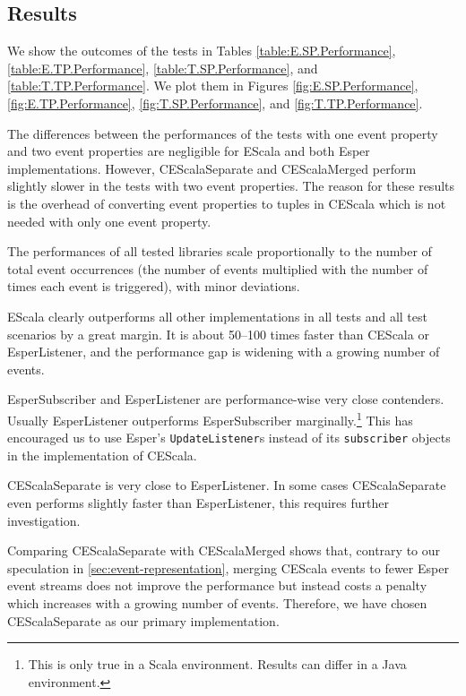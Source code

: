 \documentclass[book,type=bsc,colorback,accentcolor=tud8b,12pt,twoside]{tudthesis}
\begin{document}
\subsection{Results}
\label{sec:results}

We show the outcomes of the tests in Tables \ref{table:E.SP.Performance}, \ref{table:E.TP.Performance}, \ref{table:T.SP.Performance}, and \ref{table:T.TP.Performance}.  We plot them in Figures \ref{fig:E.SP.Performance}, \ref{fig:E.TP.Performance}, \ref{fig:T.SP.Performance}, and \ref{fig:T.TP.Performance}.  

The differences between the performances of the tests with one event property and two event properties are negligible for EScala and both Esper implementations.  However, CEScalaSeparate and CEScalaMerged perform slightly slower in the tests with two event properties.  The reason for these results is the overhead of converting event properties to tuples in CEScala which is not needed with only one event property.  

The performances of all tested libraries scale proportionally to the number of total event occurrences (the number of events multiplied with the number of times each event is triggered), with minor deviations.  

EScala clearly outperforms all other implementations in all tests and all test scenarios by a great margin.  It is about 50--100 times faster than CEScala or EsperListener, and the performance gap is widening with a growing number of events.  

EsperSubscriber and EsperListener are performance-wise very close contenders.  Usually EsperListener outperforms EsperSubscriber marginally.\footnote{This is only true in a Scala environment.  Results can differ in a Java environment.}  This has encouraged us to use Esper's \mbox{\texttt{UpdateListener}}s instead of its \mbox{\texttt{subscriber}} objects in the implementation of CEScala.  

CEScalaSeparate is very close to EsperListener.  In some cases CEScalaSeparate even performs slightly faster than EsperListener, this requires further investigation.  

Comparing CEScalaSeparate with CEScalaMerged shows that, contrary to our speculation in \autoref{sec:event-representation}, merging CEScala events to fewer Esper event streams does not improve the performance but instead costs a penalty which increases with a growing number of events.  Therefore, we have chosen CEScalaSeparate as our primary implementation.  
\end{document}
